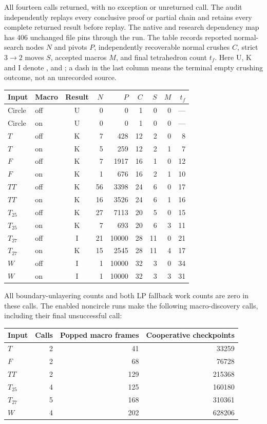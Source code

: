 All fourteen calls returned, with no exception or unreturned call.
The audit independently replays every conclusive proof or partial
chain and retains every complete returned result before replay.
The native and research dependency map has $406$ unchanged file pins
through the run.  The table records reported normal-search nodes $N$
and pivots $P$, independently recoverable normal crushes $C$, strict
$3\to2$ moves $S$, accepted macros $M$, and final tetrahedron count
$t_f$.  Here U, K and I denote ,  and
; a dash in the last column means the terminal
empty crushing outcome, not an unrecorded source.
\begin{center}\small
\begin{tabular}{llcrrrrrr}
\toprule
Input & Macro & Result & $N$ & $P$ & $C$ & $S$ & $M$ & $t_f$\\
\midrule
Circle & off & U & 0 & 0 & 1 & 0 & 0 & ---\\
Circle & on  & U & 0 & 0 & 1 & 0 & 0 & ---\\
$T$ & off & K & 7 & 428 & 12 & 2 & 0 & 8\\
$T$ & on  & K & 5 & 259 & 12 & 2 & 1 & 7\\
$F$ & off & K & 7 & 1917 & 16 & 1 & 0 & 12\\
$F$ & on  & K & 1 & 676 & 16 & 2 & 1 & 10\\
$TT$ & off & K & 56 & 3398 & 24 & 6 & 0 & 17\\
$TT$ & on  & K & 16 & 3526 & 24 & 6 & 1 & 16\\
$T_{25}$ & off & K & 27 & 7113 & 20 & 5 & 0 & 15\\
$T_{25}$ & on  & K & 7 & 693 & 20 & 6 & 3 & 11\\
$T_{27}$ & off & I & 21 & 10000 & 28 & 11 & 0 & 21\\
$T_{27}$ & on  & K & 15 & 2545 & 28 & 11 & 4 & 17\\
$W$ & off & I & 1 & 10000 & 32 & 3 & 0 & 34\\
$W$ & on  & I & 1 & 10000 & 32 & 3 & 3 & 31\\
\bottomrule
\end{tabular}
\end{center}
All boundary-unlayering counts and both LP fallback work counts are
zero in these calls.  The enabled noncircle runs make the following
macro-discovery calls, including their final unsuccessful call:
\begin{center}\small
\begin{tabular}{lrrr}
\toprule
Input & Calls & Popped macro frames & Cooperative checkpoints\\
\midrule
$T$ & 2 & 41 & 33259\\
$F$ & 2 & 68 & 76728\\
$TT$ & 2 & 129 & 215368\\
$T_{25}$ & 4 & 125 & 160180\\
$T_{27}$ & 5 & 168 & 310361\\
$W$ & 4 & 202 & 628206\\
\bottomrule
\end{tabular}
\end{center}
